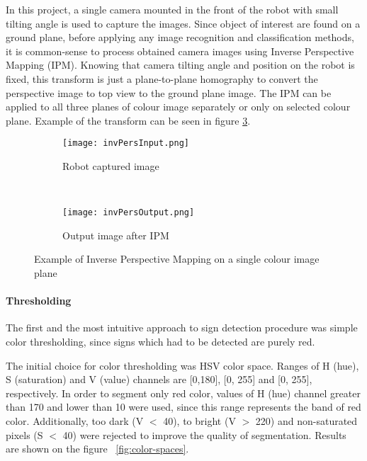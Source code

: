 In this project, a single camera mounted in the front of the robot with small tilting angle is used to capture the images. Since object of interest are found on a ground plane, before applying any image recognition and classification methods, it is common-sense to process obtained camera images using Inverse Perspective Mapping (IPM).
Knowing that camera tilting angle and position on the robot is fixed, this transform is just a  plane-to-plane homography to convert the perspective image to
top view to the ground plane image. The IPM can be applied to all three planes of colour image separately or only on selected colour plane. Example of the transform can be seen in figure \ref{fig:ipm_example}.
\begin{figure}[!ht]
	\centering
	\begin{subfigure}[b]{0.3\textwidth}
		\texttt{[image: invPersInput.png]}
		\caption{Robot captured image}
		\label{fig:}
	\end{subfigure}%
	~ 
	\begin{subfigure}[b]{0.3\textwidth}
		\texttt{[image: invPersOutput.png]}
		\caption{Output image after IPM}
		\label{fig:}
	\end{subfigure}
	\caption{Example of Inverse Perspective Mapping on a single colour image plane}
	\label{fig:ipm_example}
\end{figure}

\newpage

\paragraph{Thresholding}

The first and the most intuitive approach to sign detection procedure was simple color thresholding, since signs which had to be detected are purely red.

The initial choice for color thresholding was HSV color space. Ranges of H (hue), S (saturation) and V (value) channels are [0,180], [0, 255] and [0, 255], respectively. In order to segment only red color, values of H (hue) channel greater than 170 and lower than 10 were used, since this range represents the band of red color. Additionally, too dark (V $ < $ 40), to bright (V $ > $ 220) and non-saturated pixels (S $ < $ 40) were rejected to improve the quality of segmentation. Results are shown on the figure ~\ref{fig:color-spaces}.

